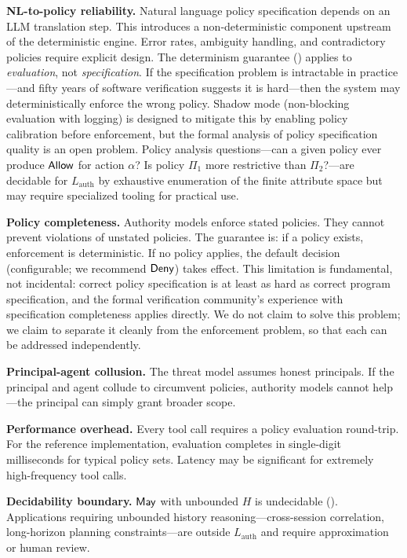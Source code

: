 \documentclass[11pt,a4paper]{article}
\newcommand{\termlabel}[1]{\ifmmode\mathsf{#1}\else{\normalfont\textsc{\MakeLowercase{#1}}}\fi}
\newcommand{\May}{\termlabel{May}}
\newcommand{\Allow}{\termlabel{Allow}}
\newcommand{\Deny}{\termlabel{Deny}}
\begin{document}
\textbf{NL-to-policy reliability.} Natural language policy specification depends on an LLM translation step. This introduces a non-deterministic component upstream of the deterministic engine. Error rates, ambiguity handling, and contradictory policies require explicit design. The determinism guarantee () applies to \emph{evaluation}, not \emph{specification}. If the specification problem is intractable in practice---and fifty years of software verification suggests it is hard---then the system may deterministically enforce the wrong policy. Shadow mode (non-blocking evaluation with logging) is designed to mitigate this by enabling policy calibration before enforcement, but the formal analysis of policy specification quality is an open problem. Policy analysis questions---can a given policy ever produce $\Allow$ for action $\alpha$? Is policy $\Pi_1$ more restrictive than $\Pi_2$?---are decidable for $L_{\mathrm{auth}}$ by exhaustive enumeration of the finite attribute space but may require specialized tooling for practical use.

\textbf{Policy completeness.} Authority models enforce stated policies. They cannot prevent violations of unstated policies. The guarantee is: if a policy exists, enforcement is deterministic. If no policy applies, the default decision (configurable; we recommend $\Deny$) takes effect. This limitation is fundamental, not incidental: correct policy specification is at least as hard as correct program specification, and the formal verification community's experience with specification completeness applies directly. We do not claim to solve this problem; we claim to separate it cleanly from the enforcement problem, so that each can be addressed independently.

\textbf{Principal-agent collusion.} The threat model assumes honest principals. If the principal and agent collude to circumvent policies, authority models cannot help---the principal can simply grant broader scope.

\textbf{Performance overhead.} Every tool call requires a policy evaluation round-trip. For the reference implementation, evaluation completes in single-digit milliseconds for typical policy sets. Latency may be significant for extremely high-frequency tool calls.

\textbf{Decidability boundary.} $\May$ with unbounded $H$ is undecidable (). Applications requiring unbounded history reasoning---cross-session correlation, long-horizon planning constraints---are outside $L_{\mathrm{auth}}$ and require approximation or human review.
\end{document}
